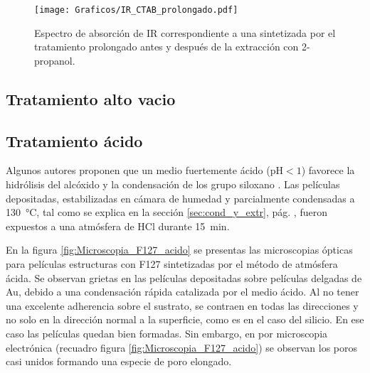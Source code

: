 {		\begin{figure}[!ht]
			\begin{center}
			\texttt{[image: Graficos/IR\_CTAB\_prolongado.pdf]}
			\caption[FTIR \pdmC\space tratamiento prolongado.]{Espectro de absorción de IR correspondiente a una \pdmC\space sintetizada por el tratamiento prolongado antes y después de la extracción con 2-propanol.}
			\label{fig:IR_CTAB_prolongado}
			\end{center}
			\end{figure}	

		\pagebreak

	\subsection{Tratamiento alto vacio}\label{sec:trat-vacio}
					
	\subsection{Tratamiento ácido}
		
		Algunos autores proponen que un medio fuertemente ácido (pH$<1$) favorece la hidrólisis del alcóxido y la condensación de los grupo siloxano \cite{Soler-Illia2011,Doshi2000a,Boissiere2000,Huo1996,Beck1992}. Las películas depositadas, estabilizadas en cámara de humedad y  parcialmente condensadas a \SI{130}{\celsius}, tal como se explica en la sección \ref{sec:cond_y_extr}, pág. \pageref{sec:cond_y_extr}, fueron expuestos a una atmósfera de HCl durante \SI{15}{\minute}. 

		En la figura \ref{fig:Microscopia_F127_acido} se presentas las microscopias ópticas para películas estructuras con F127 sintetizadas por el método de atmósfera ácida. Se observan grietas en las películas depositadas sobre películas delgadas de Au, debido a una condensación rápida catalizada por el medio ácido. Al no tener una excelente adherencia sobre el sustrato, se contraen en todas las direcciones y no solo en la dirección normal a la superficie, como es en el caso del silicio\cite{Sakatani2006,Boissiere2005,Guillemin2010}. En ese caso las películas quedan bien formadas. Sin embargo, en por microscopia electrónica (recuadro figura \ref{fig:Microscopia_F127_acido}) se observan los poros casi unidos formando una especie de poro elongado.

}
